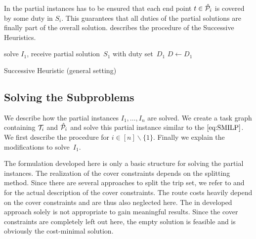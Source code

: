 In the partial instances has to be ensured that each end point ${t\in\hat{\mathcal{P}}_i}$ is covered by some duty in $S_i$. This guarantees that all duties of the partial solutions are finally part of the overall solution.  describes the procedure of the Successive Heuristics.

\begin{algorithm}[htb]
	\SetAlgoLined
	solve $I_1$, receive partial solution~$S_1$ with duty set~$D_1$\;
	$D\gets D_1$\;
	\caption{Successive Heuristic (general setting) \label{alg:successive_heuristic}}
\end{algorithm}


\subsection{Solving the Subproblems}

We describe how the partial instances ${I_1,\dots,I_n}$ are solved. We create a task graph containing $\mathcal{T}_i$ and $\hat{\mathcal{P}}_i$ and solve this partial instance similar to the $\eqref{eq:SMILP}$. We first describe the procedure for ${i\in[n]\backslash\{1\}}$. Finally we explain the modifications to solve~$I_1$.

\begin{remark}

The formulation developed here is only a basic structure for solving the partial instances. The realization of the cover constraints depends on the splitting method. Since there are several approaches to split the trip set, we refer to  and  for the actual description of the cover constraints. The route costs heavily depend on the cover constraints and are thus also neglected here. The in  developed approach solely is not appropriate to gain meaningful results. Since the cover constraints are completely left out here, the empty solution is feasible and is obviously the cost-minimal solution.

\end{remark}

